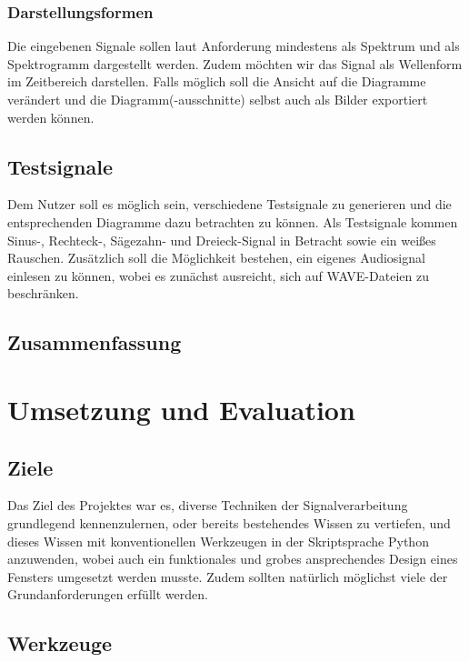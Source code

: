 \documentclass[a4paper]{article}
\begin{document}
\subsubsection{Darstellungsformen}

Die eingebenen Signale sollen laut Anforderung mindestens als Spektrum und als Spektrogramm dargestellt werden. Zudem möchten wir das Signal als Wellenform im Zeitbereich darstellen. Falls möglich soll die Ansicht auf die Diagramme verändert und die Diagramm(-ausschnitte) selbst auch als Bilder exportiert werden können.

\subsection{Testsignale}\label{subsec:testsignale}

Dem Nutzer soll es möglich sein, verschiedene Testsignale zu generieren und die entsprechenden Diagramme dazu betrachten zu können. Als Testsignale kommen Sinus-, Rechteck-, Sägezahn- und Dreieck-Signal in Betracht sowie ein weißes Rauschen. Zusätzlich soll die Möglichkeit bestehen, ein eigenes Audiosignal einlesen zu können, wobei es zunächst ausreicht, sich auf WAVE-Dateien zu beschränken.

\subsection{Zusammenfassung}\label{subsec:zusammenfassung}

\newpage
\section{Umsetzung und Evaluation}\label{sec:umsetzungUndEvaluation}

\subsection{Ziele}\label{subsec:ziele}

Das Ziel des Projektes war es, diverse Techniken der Signalverarbeitung grundlegend kennenzulernen, oder bereits bestehendes Wissen zu vertiefen, und dieses Wissen mit konventionellen Werkzeugen in der Skriptsprache Python anzuwenden, wobei auch ein funktionales und grobes ansprechendes Design eines Fensters umgesetzt werden musste. Zudem sollten natürlich möglichst viele der Grundanforderungen erfüllt werden.

\subsection{Werkzeuge}\label{subsec:werkzeuge}
\end{document}
